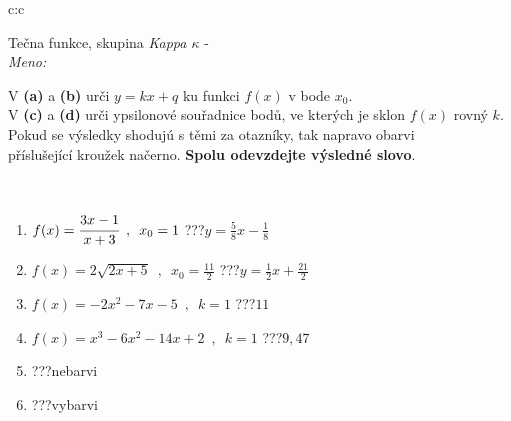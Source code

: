 \documentclass[10pt]{report}
\begin{document}
\newpage
\thispagestyle{empty}
\begin{tabular}{c:c}
\begin{minipage}[c][104.5mm][t]{0.5\linewidth}
\begin{center}
\vspace{7mm}
{\huge Tečna funkce, skupina \textit{Kappa $\kappa$} -}\\[5mm]
\textit{Meno:}\phantom{xxxxxxxxxxxxxxxxxxxxxxxxxxxxxxxxxxxxxxxxxxxxxxxxxxxxxxxxxxxxxxxxx}\\[5mm]
\begin{minipage}{0.95\linewidth}
\begin{center}
V \textbf{(a)} a \textbf{(b)} urči  $y = kx + q$ ku funkci $f(x)$ v bode $x_0$.\\V \textbf{(c)} a \textbf{(d)} urči ypsilonové souřadnice bodů, ve kterých je sklon $f(x)$ rovný $k$.\\Pokud se výsledky shodujú s těmi za otazníky, tak napravo obarvi\\příslušející kroužek načerno. \textbf{Spolu odevzdejte výsledné slovo}.
\end{center}
\end{minipage}
\\[1mm]
\begin{minipage}{0.79\linewidth}
\begin{center}
\begin{varwidth}{\linewidth}
\begin{enumerate}
\small
\item $f(x)=\cfrac{3x-1}{x+3}\enspace , \enspace x_0=1$\quad \dotfill\; ???\;\dotfill \quad $y = \frac{5}{8}x-\frac{1}{8}$
\item $f(x)=2\sqrt{2x+5}\enspace , \enspace x_0=\frac{11}{2}$\quad \dotfill\; ???\;\dotfill \quad $y = \frac{1}{2}x+\frac{21}{2}$
\item $f(x)=-2x^2-7x-5\enspace , \enspace k=1$\quad \dotfill\; ???\;\dotfill \quad $11$
\item $f(x)=x^3-6x^2-14x+2\enspace , \enspace k=1$\quad \dotfill\; ???\;\dotfill \quad $9 , 47$
\item \quad \dotfill\; ???\;\dotfill \quad nebarvi
\item \quad \dotfill\; ???\;\dotfill \quad vybarvi
\end{enumerate}
\end{varwidth}
\end{center}
\end{minipage}
\begin{minipage}{0.20\linewidth}

\end{minipage}
\end{center}
\end{minipage}
\end{tabular}
\end{document}
